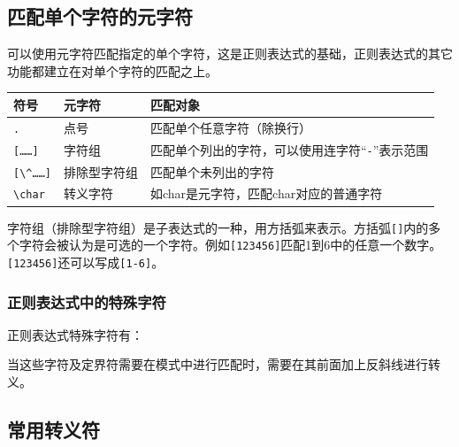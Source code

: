 \documentclass[]{ctexbook}
\newenvironment{Shaded}{\begin{snugshade}}{\end{snugshade}}
\newcommand{\NormalTok}[1]{#1}
\newcommand{\OperatorTok}[1]{\textcolor[rgb]{0.81,0.36,0.00}{\textbf{#1}}}
\begin{document}
\hypertarget{ux5339ux914dux5355ux4e2aux5b57ux7b26ux7684ux5143ux5b57ux7b26}{%
\subsection{匹配单个字符的元字符}\label{ux5339ux914dux5355ux4e2aux5b57ux7b26ux7684ux5143ux5b57ux7b26}}

可以使用元字符匹配指定的单个字符，这是正则表达式的基础，正则表达式的其它功能都建立在对单个字符的匹配之上。

\begin{longtable}[]{@{}lll@{}}
\toprule
符号 & 元字符 & 匹配对象\tabularnewline
\midrule
\endhead
\texttt{.} & 点号 & 匹配单个任意字符（除换行）\tabularnewline
\texttt{{[}\ldots{}\ldots{}{]}} & 字符组 & 匹配单个列出的字符，可以使用连字符``\texttt{-}''表示范围\tabularnewline
\texttt{{[}\textbackslash{}\^{}\ldots{}\ldots{}{]}} & 排除型字符组 & 匹配单个未列出的字符\tabularnewline
\texttt{\textbackslash{}char} & 转义字符 & 如char是元字符，匹配char对应的普通字符\tabularnewline
\bottomrule
\end{longtable}

字符组（排除型字符组）是子表达式的一种，用方括弧来表示。方括弧\texttt{{[}{]}}内的多个字符会被认为是可选的一个字符。例如\texttt{{[}123456{]}}匹配1到6中的任意一个数字。\texttt{{[}123456{]}}还可以写成\texttt{{[}1-6{]}}。

\hypertarget{ux6b63ux5219ux8868ux8fbeux5f0fux4e2dux7684ux7279ux6b8aux5b57ux7b26}{%
\subsubsection{正则表达式中的特殊字符}\label{ux6b63ux5219ux8868ux8fbeux5f0fux4e2dux7684ux7279ux6b8aux5b57ux7b26}}

正则表达式特殊字符有：

\begin{Shaded}
\end{Shaded}

当这些字符及定界符需要在模式中进行匹配时，需要在其前面加上反斜线进行转义。

\hypertarget{ux5e38ux7528ux8f6cux4e49ux7b26}{%
\subsection{常用转义符}\label{ux5e38ux7528ux8f6cux4e49ux7b26}}
\end{document}
